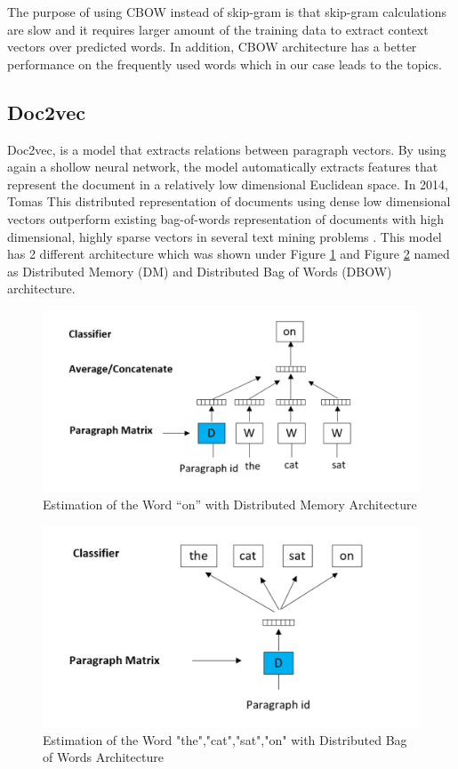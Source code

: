 \documentclass[a4paper,fleqn]{cas-dc}
\begin{document}
The purpose of using CBOW instead of skip-gram is that skip-gram calculations are slow and it requires larger amount of the training data to extract context vectors over predicted words. In addition, CBOW architecture has a better performance on the frequently used words  \citep{ref2} which in our case leads to the topics.

\subsection{Doc2vec}

Doc2vec, is a model that extracts relations between paragraph vectors. By using again a shollow neural network, the model  automatically extracts features that represent the document in a relatively low dimensional Euclidean space. In 2014, Tomas  This distributed representation of documents using dense low dimensional vectors outperform existing bag-of-words representation of documents with high dimensional, highly sparse vectors in several text mining problems \citep{ref3}.
This model has 2 different architecture which was shown under  Figure \ref{fig3} and Figure \ref{fig4} named as Distributed Memory (DM) and Distributed Bag of Words (DBOW) architecture. 
\begin{figure}
	\centering
	\includegraphics[scale=.3]{figs/fig3.pdf}
	\caption{Estimation of the Word “on” with Distributed Memory Architecture \cite{ref3}}
	\label{fig3}
\end{figure}
\begin{figure}
	\centering
	\includegraphics[scale=.3]{figs/fig4.pdf}
	\caption{Estimation of the Word "the","cat","sat","on" with Distributed Bag of Words  Architecture \cite{ref3}}
	\label{fig4}
\end{figure}
\end{document}

